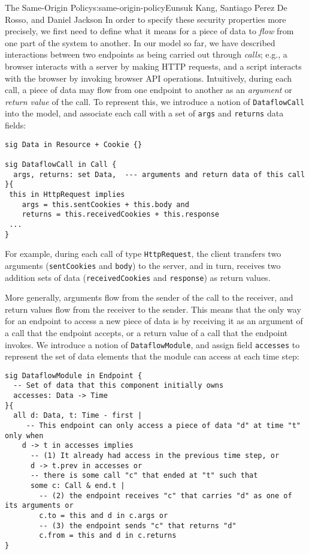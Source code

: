 \begin{aosachapter}{The Same-Origin Policy}{s:same-origin-policy}{Eunsuk Kang, Santiago Perez De Rosso, and Daniel Jackson}
In order to specify these security properties more precisely, we first
need to define what it means for a piece of data to \emph{flow} from one
part of the system to another. In our model so far, we have described
interactions between two endpoints as being carried out through
\emph{calls}; e.g., a browser interacts with a server by making HTTP
requests, and a script interacts with the browser by invoking browser
API operations. Intuitively, during each call, a piece of data may flow
from one endpoint to another as an \emph{argument} or \emph{return
value} of the call. To represent this, we introduce a notion of
\texttt{DataflowCall} into the model, and associate each call with a set
of \texttt{args} and \texttt{returns} data fields:

\begin{verbatim}
sig Data in Resource + Cookie {}

sig DataflowCall in Call {
  args, returns: set Data,  --- arguments and return data of this call
}{
 this in HttpRequest implies
    args = this.sentCookies + this.body and
    returns = this.receivedCookies + this.response
 ...
}
\end{verbatim}

For example, during each call of type \texttt{HttpRequest}, the client
transfers two arguments (\texttt{sentCookies} and \texttt{body}) to the
server, and in turn, receives two addition sets of data
(\texttt{receivedCookies} and \texttt{response}) as return values.

More generally, arguments flow from the sender of the call to the
receiver, and return values flow from the receiver to the sender. This
means that the only way for an endpoint to access a new piece of data is
by receiving it as an argument of a call that the endpoint accepts, or a
return value of a call that the endpoint invokes. We introduce a notion
of \texttt{DataflowModule}, and assign field \texttt{accesses} to
represent the set of data elements that the module can access at each
time step:

\begin{verbatim}
sig DataflowModule in Endpoint {
  -- Set of data that this component initially owns
  accesses: Data -> Time
}{
  all d: Data, t: Time - first |
     -- This endpoint can only access a piece of data "d" at time "t" only when
    d -> t in accesses implies
      -- (1) It already had access in the previous time step, or
      d -> t.prev in accesses or
      -- there is some call "c" that ended at "t" such that
      some c: Call & end.t |
        -- (2) the endpoint receives "c" that carries "d" as one of its arguments or
        c.to = this and d in c.args or
        -- (3) the endpoint sends "c" that returns "d" 
        c.from = this and d in c.returns 
}
\end{verbatim}


\end{aosachapter}
